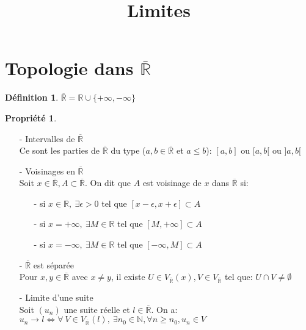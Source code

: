 \documentclass[fleqn]{article}
\title{Limites}
\date{}
\theoremstyle{definition} \newtheorem*{defi}{D\'efinition}
\theoremstyle{definition} \newtheorem*{theo}{Th\'eor\`eme}
\theoremstyle{definition} \newtheorem*{prop}{Propri\'et\'e}
\theoremstyle{remark} \newtheorem*{rqs}{Remarques}
\begin{document}
\maketitle

\section{Topologie dans $\overline{\mathbb{R}}$}
\begin{defi}
	$\overline{\mathbb{R}} = \mathbb{R} \cup \{ +\infty, -\infty\}$
\end{defi}

\begin{prop} $ $
	\begin{itemize}
		\item [-] Intervalles de $\overline{\mathbb{R}}$ \\
			Ce sont les parties de $\overline{\mathbb{R}}$ du type ($a,b \in \overline{\mathbb{R}}$ et $a \leq b$): $[a,b]$ ou $[a,b[$ ou $]a,b[$
		\item [-] Voisinages en $\overline{\mathbb{R}}$ \\
			Soit $x \in \overline{\mathbb{R}}, A \subset \overline{\mathbb{R}}$. On dit que $A$ est voisinage de $x$ dans
			$\overline{\mathbb{R}}$ si:
				\begin{itemize}
					\item[-] si $x \in \mathbb{R},\ \exists \epsilon > 0$ tel que $[x - \epsilon, x + \epsilon] \subset A$
					\item[-] si $x = +\infty,\ \exists M \in \mathbb{R}$ tel que $[M, +\infty] \subset A$
					\item[-] si $x = - \infty,\ \exists M \in \mathbb{R}$ tel que $[-\infty, M] \subset A$
				\end{itemize}
		\item [-]  $\overline{\mathbb{R}}$ est s\'epar\'ee \\
			Pour $x, y \in \overline{\mathbb{R}}$ avec $x \neq y$, il existe $U \in V_{\overline{\mathbb{R}}%
			}(x), V \in V_{\overline{\mathbb{R}}%
			}$ tel que: $U \cap V \neq \emptyset$
		\item [-] Limite d'une suite \\
			Soit $(u_n)$ une suite r\'eelle et $l \in \overline{\mathbb{R}}$. On a: \\
			$u_n \rightarrow l \Leftrightarrow \forall\ V \in V_{\overline{\mathbb{R}}%
			}(l),\ \exists n_0 \in \mathbb{N}, \forall n \geq n_0, u_n \in V$
	\end{itemize}
\end{prop}
\end{document}
